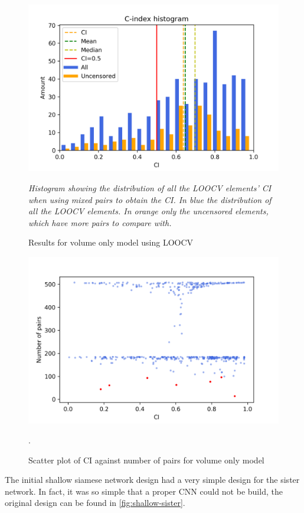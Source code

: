 \begin{figure}
  \centering
  \includegraphics[width=.8\textwidth]{images/results/c-index_volume}
  \caption{Results for volume only model using \acrshort{LOOCV} \label{fig:results-volume-LOOCV}}

  \itshape\justify
  Histogram showing the distribution of all the \acrshort{LOOCV} elements' \acrshort{CI}
  when using mixed pairs to obtain the \acrshort{CI}. 
  In blue the distribution of all the \acrshort{LOOCV} elements. In orange only the uncensored
  elements, which have more pairs to compare with.
\end{figure}
\begin{figure}
  \centering
  \includegraphics[width=.8\textwidth]{images/results/scatter_volume}
  \caption{Scatter plot of \acrshort{CI} against number of pairs for volume only model
  \label{fig:scatter-volume-CI}
  }.
\end{figure}

\label{sec:shallow-siamese}

The initial shallow siamese network design had a very simple design for the sister network. 
In fact, it was so simple that a proper \gls{CNN} could not be build, the original design 
can be found in \autoref{fig:shallow-sister}.

